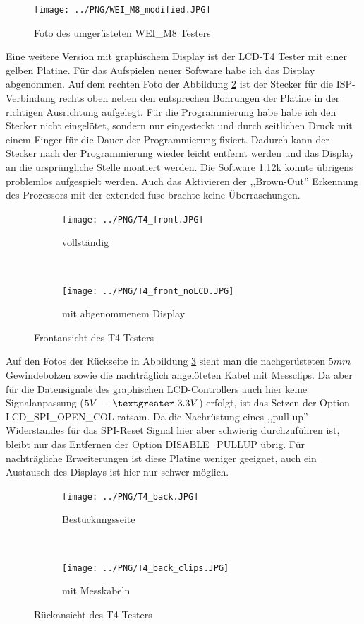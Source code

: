 \begin{figure}[H]
\centering
\texttt{[image: ../PNG/WEI\_M8\_modified.JPG]}
\caption{Foto des umgerüsteten WEI\_M8 Testers}
\label{fig:WeiM8mod}
\end{figure}

Eine weitere Version mit graphischem Display ist der LCD-T4 Tester mit einer gelben Platine.
Für das Aufspielen neuer Software habe ich das Display abgenommen.
Auf dem rechten Foto der Abbildung \ref{fig:T4_front} ist der Stecker für die ISP-Verbindung rechts oben
 neben den entsprechen Bohrungen der Platine in der richtigen Ausrichtung aufgelegt.
Für die Programmierung habe habe ich den Stecker nicht eingelötet, sondern nur eingesteckt und durch
seitlichen Druck mit einem Finger für die Dauer der Programmierung fixiert.
Dadurch kann der Stecker nach der Programmierung wieder leicht entfernt werden und das Display
an die ursprüngliche Stelle montiert werden.
Die Software 1.12k konnte übrigens problemlos aufgespielt werden.
Auch das Aktivieren der ,,Brown-Out'' Erkennung des Prozessors mit der extended fuse
brachte keine Überraschungen.

\begin{figure}[H]
  \begin{subfigure}[b]{9cm}
    \centering
    \texttt{[image: ../PNG/T4\_front.JPG]}
    \caption{vollständig}
  \end{subfigure}
  ~
  \begin{subfigure}[b]{9cm}
    \centering
    \texttt{[image: ../PNG/T4\_front\_noLCD.JPG]}
    \caption{mit abgenommenem Display}
  \end{subfigure}
  \caption{Frontansicht des T4 Testers}
  \label{fig:T4_front}
\end{figure}

Auf den Fotos der Rückseite in Abbildung \ref{fig:T4_back} sieht man die nachgerüsteten
\(5mm\) Gewindebolzen sowie die nachträglich angelöteten Kabel mit Messclips.
Da aber für die Datensignale des graphischen LCD-Controllers auch hier
keine Signalanpassung (\(5V~-\textgreater ~3.3V\)) erfolgt, ist das Setzen der Option LCD\_SPI\_OPEN\_COL ratsam.
Da die Nachrüstung eines ,,pull-up'' Widerstandes für das SPI-Reset Signal hier
aber schwierig durchzuführen ist, bleibt nur das Entfernen der Option
DISABLE\_PULLUP übrig. 
Für nachträgliche Erweiterungen ist diese Platine weniger geeignet, auch ein Austausch des
Displays ist hier nur schwer möglich.

\begin{figure}[H]
  \begin{subfigure}[b]{9cm}
    \centering
    \texttt{[image: ../PNG/T4\_back.JPG]}
    \caption{Bestückungsseite}
  \end{subfigure}
  ~
  \begin{subfigure}[b]{9cm}
    \centering
    \texttt{[image: ../PNG/T4\_back\_clips.JPG]}
    \caption{mit Messkabeln}
  \end{subfigure}
  \caption{Rückansicht des T4 Testers}
  \label{fig:T4_back}
\end{figure}

